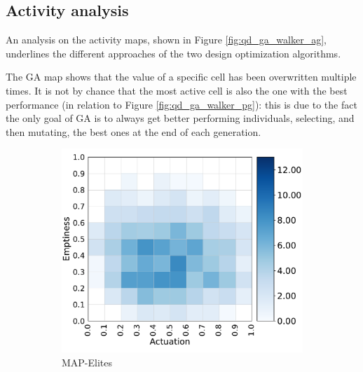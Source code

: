 \subsection{Activity analysis}
An analysis on the activity maps, shown in Figure \ref{fig:qd_ga_walker_ag}, underlines the different approaches of the two design optimization algorithms.

The GA map shows that the value of a specific cell has been overwritten multiple times. It is not by chance that the most active cell is also the one with the best performance (in relation to Figure \ref{fig:qd_ga_walker_pg}): this is due to the fact the only goal of GA is to always get better performing individuals, selecting, and then mutating, the best ones at the end of each generation.

\begin{figure}[H]
    \centering
    \begin{subfigure}[b]{0.49\textwidth}
         \centering
         \includegraphics[scale=0.45]{images/body_opt/walker_qd_ag}
         \caption{MAP-Elites}
    \end{subfigure}
    \hfill
    \begin{subfigure}[b]{0.49\textwidth}
         \centering

\end{subfigure}
\end{figure}
